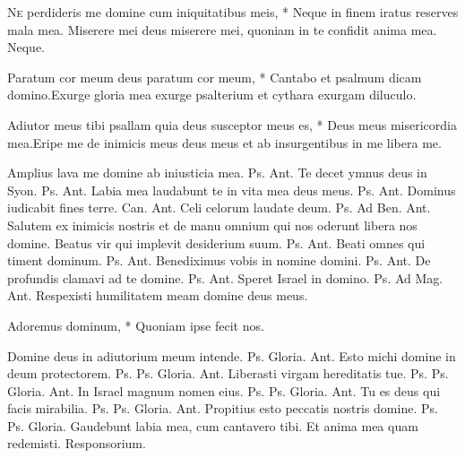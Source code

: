 \begin{multicols*}{2}
\lettrine[lines=2]{\zallmancaps \color{Red} N}{e} \hypertarget{ne-perdideris}{\label{ne-perdideris}} perdideris me domine cum iniquitatibus meis, * Neque in finem iratus reserves mala mea. \V Miserere mei deus miserere mei, quoniam in te confidit anima mea. Neque.
\begin{responsory}
{Paratum cor meum deus paratum cor meum, * Cantabo et psalmum dicam domino.}{Exurge gloria mea exurge psalterium et cythara exurgam diluculo.}
\end{responsory}
\begin{responsory-doxology}
{Adiutor meus tibi psallam quia deus susceptor meus es, * Deus meus misericordia mea.}{Eripe me de inimicis meus deus meus et ab insurgentibus in me libera me.}
\end{responsory-doxology}
 Amplius lava me domine ab iniusticia mea. {\color{Red} Ps.}  {\color{Red} Ant.} Te decet ymnus deus in Syon. {\color{Red} Ps.}  {\color{Red} Ant.} Labia mea laudabunt te in vita mea deus meus. {\color{Red} Ps.}  {\color{Red} Ant.} Dominus iudicabit fines terre. {\color{Red} Can.}  {\color{Red} Ant.} Celi celorum laudate deum. {\color{Red} Ps.}  {\color{Red} Ad Ben. Ant.} Salutem ex inimicis nostris et de manu omnium qui nos oderunt libera nos domine.
 Beatus vir qui implevit desiderium suum. {\color{Red} Ps.}  {\color{Red} Ant.} Beati omnes qui timent dominum. {\color{Red} Ps.}  {\color{Red} Ant.} Benediximus vobis in nomine domini. {\color{Red} Ps.}  {\color{Red} Ant.} De profundis clamavi ad te domine. {\color{Red} Ps.}  {\color{Red} Ant.} Speret Israel in domino. {\color{Red} Ps.}  {\color{Red} Ad Mag. Ant.} Respexisti humilitatem meam domine deus meus.
{\color{Red} }
\par {}
\begin{invitatory}
{Adoremus dominum, * Quoniam ipse fecit nos.}
\end{invitatory}
 Domine deus in adiutorium meum intende. {\color{Red} Ps.}
  Gloria. {\color{Red} Ant.} Esto michi domine in deum protectorem. {\color{Red} Ps.}  {\color{Red} Ps.}  Gloria. {\color{Red} Ant.} Liberasti virgam hereditatis tue. {\color{Red} Ps.}  {\color{Red} Ps.}  Gloria. {\color{Red} Ant.} In Israel magnum nomen eius. {\color{Red} Ps.}  {\color{Red} Ps.}  Gloria. {\color{Red} Ant.} Tu es deus qui facis mirabilia. {\color{Red} Ps.}  {\color{Red} Ps.}  Gloria. {\color{Red} Ant.} Propitius esto peccatis nostris domine. {\color{Red} Ps.}  {\color{Red} Ps.}  Gloria. \V Gaudebunt labia mea, cum cantavero tibi. \R Et anima mea quam redemisti. {\color{Red} Responsorium.}

\end{multicols*}
